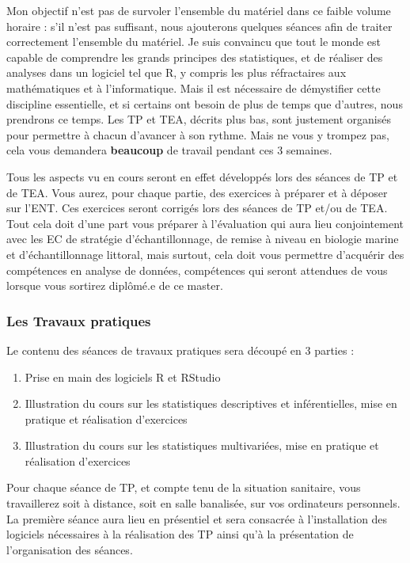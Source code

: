 \documentclass[
  a4paper,
]{article}
\providecommand{\tightlist}{%
  \setlength{\itemsep}{0pt}\setlength{\parskip}{0pt}}
\begin{document}
Mon objectif n'est pas de survoler l'ensemble du matériel dans ce faible volume horaire : s'il n'est pas suffisant, nous ajouterons quelques séances afin de traiter correctement l'ensemble du matériel. Je suis convaincu que tout le monde est capable de comprendre les grands principes des statistiques, et de réaliser des analyses dans un logiciel tel que R, y compris les plus réfractaires aux mathématiques et à l'informatique. Mais il est nécessaire de démystifier cette discipline essentielle, et si certains ont besoin de plus de temps que d'autres, nous prendrons ce temps. Les TP et TEA, décrits plus bas, sont justement organisés pour permettre à chacun d'avancer à son rythme. Mais ne vous y trompez pas, cela vous demandera \textbf{beaucoup} de travail pendant ces 3 semaines.

Tous les aspects vu en cours seront en effet développés lors des séances de TP et de TEA. Vous aurez, pour chaque partie, des exercices à préparer et à déposer sur l'ENT. Ces exercices seront corrigés lors des séances de TP et/ou de TEA. Tout cela doit d'une part vous préparer à l'évaluation qui aura lieu conjointement avec les EC de stratégie d'échantillonnage, de remise à niveau en biologie marine et d'échantillonnage littoral, mais surtout, cela doit vous permettre d'acquérir des compétences en analyse de données, compétences qui seront attendues de vous lorsque vous sortirez diplômé.e de ce master.

\hypertarget{les-travaux-pratiques}{%
\subsubsection{Les Travaux pratiques}\label{les-travaux-pratiques}}

Le contenu des séances de travaux pratiques sera découpé en 3 parties :

\begin{enumerate}
\def\labelenumi{\arabic{enumi}.}
\tightlist
\item
  Prise en main des logiciels R et RStudio
\item
  Illustration du cours sur les statistiques descriptives et inférentielles, mise en pratique et réalisation d'exercices
\item
  Illustration du cours sur les statistiques multivariées, mise en pratique et réalisation d'exercices
\end{enumerate}

Pour chaque séance de TP, et compte tenu de la situation sanitaire, vous travaillerez soit à distance, soit en salle banalisée, sur vos ordinateurs personnels. La première séance aura lieu en présentiel et sera consacrée à l'installation des logiciels nécessaires à la réalisation des TP ainsi qu'à la présentation de l'organisation des séances.
\end{document}
